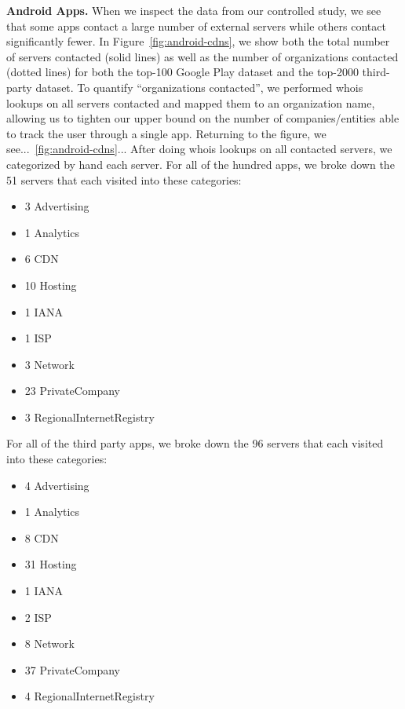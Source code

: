   {\bf Android Apps.}
  When we inspect the data from our controlled study, we see that some apps contact a large number of external servers while others contact significantly fewer.
  In Figure~\ref{fig:android-cdns}, we show both the total number of servers contacted (solid lines) as well as the number of organizations contacted (dotted lines) for both the top-100 Google Play dataset and the top-2000 third-party dataset.
  To quantify ``organizations contacted'', we performed whois lookups on all servers contacted and mapped them to an organization name, allowing us to tighten our upper bound on the number of companies/entities able to track the user through a single app.
  Returning to the figure, we see...~\ref{fig:android-cdns}...
After doing whois lookups on all contacted servers, we categorized by hand each server.
For all of the hundred apps, we broke down the 51 servers that each visited into these categories:
\begin{itemize}
   \item 3 Advertising
   \item 1 Analytics
   \item 6 CDN
  \item 10 Hosting
  \item  1 IANA
  \item  1 ISP
   \item 3 Network
  \item 23 PrivateCompany
   \item 3 RegionalInternetRegistry
\end{itemize}
   For all of the third party apps, we broke down the 96 servers that each visited into these categories:
\begin{itemize}
\item      4 Advertising
 \item   1 Analytics
 \item   8 CDN
 \item  31 Hosting
 \item   1 IANA
 \item   2 ISP
\item    8 Network
\item   37 PrivateCompany
 \item   4 RegionalInternetRegistry
 \end{itemize}
   
